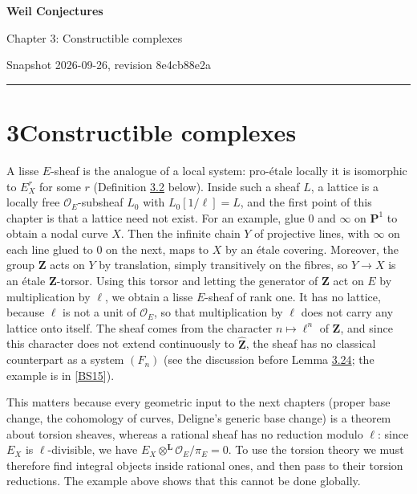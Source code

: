 \documentclass[11pt]{article}
\begin{document}
\pagestyle{plain}
\begin{center}
{\LARGE\bfseries Weil Conjectures\par}
\vspace{0.7em}
{\large Chapter 3: Constructible complexes\par}
\vspace{0.5em}
{\small\color{bpmuted}Snapshot 2026-09-26, revision 8e4cb88e2a\par}
\end{center}
\vspace{0.5em}
{\small\tableofcontents}
\bigskip\hrule\bigskip

\section*{\texorpdfstring{3\quad Constructible complexes}{3 Constructible complexes}}
\label{bp1}%
\label{bp2}%
A lisse \(E\)-sheaf is the analogue of a local system: pro-étale locally it is isomorphic to \(E_X^r\) for some \(r\) (Definition \hyperref[bp9]{3.2} below). Inside such a sheaf \(L\), a lattice is a locally free \(\mathcal O_E\)-subsheaf \(L_0\) with \(L_0[1/\ell]=L\), and the first point of this chapter is that a lattice need not exist. For an example, glue \(0\) and \(\infty\) on \(\mathbf P^1\) to obtain a nodal curve \(X\). Then the infinite chain \(Y\) of projective lines, with \(\infty\) on each line glued to \(0\) on the next, maps to \(X\) by an étale covering. Moreover, the group \(\mathbf Z\) acts on \(Y\) by translation, simply transitively on the fibres, so \(Y\to X\) is an étale \(\mathbf Z\)-torsor. Using this torsor and letting the generator of \(\mathbf Z\) act on \(E\) by multiplication by \(\ell\), we obtain a lisse \(E\)-sheaf of rank one. It has no lattice, because \(\ell\) is not a unit of \(\mathcal O_E\), so that multiplication by \(\ell\) does not carry any lattice onto itself. The sheaf comes from the character \(n\mapsto\ell^n\) of \(\mathbf Z\), and since this character does not extend continuously to \(\widehat{\mathbf Z}\), the sheaf has no classical counterpart as a system \((F_n)\) (see the discussion before Lemma \hyperref[bp77]{3.24}; the example is in [\hyperref[bp93]{BS15}]).

This matters because every geometric input to the next chapters (proper base change, the cohomology of curves, Deligne's generic base change) is a theorem about torsion sheaves, whereas a rational sheaf has no reduction modulo \(\ell\): since \(E_X\) is \(\ell\)-divisible, we have \(E_X\otimes^{\mathbf L}\mathcal O_E/\pi_E=0\). To use the torsion theory we must therefore find integral objects inside rational ones, and then pass to their torsion reductions. The example above shows that this cannot be done globally.
\end{document}
